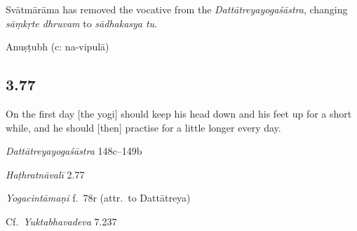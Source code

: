 \begin{ekdosis}
\begin{philcomm}[hp03_076]
Svātmārāma has removed the vocative from the \emph{Dattātreyayogaśāstra}, changing \emph{sāṃkṛte dhruvam} to \emph{sādhakasya tu}.
\end{philcomm}

\begin{metre}[hp03_076]
Anuṣṭubh (c: na-vipulā)
\end{metre}

\subsection*{3.77}
\begin{translation}[hp03_077]
On the first day [the yogi] should keep his head down and his feet up for a short while, and he should [then] practise for a little longer every day.
\end{translation}

\begin{sources}[hp03_077]
\emph{Dattātreyayogaśāstra} 148c–149b
\begin{versinnote}
\end{versinnote}
\end{sources}

\begin{testimonia}[hp03_077]
\emph{Haṭhratnāvalī} 2.77
\begin{versinnote}
\tl{\var{cordhvapādau ] cordhvapādaḥ \vl}\\!}
\end{versinnote}

\emph{Yogacintāmaṇi} f.~78r (attr.~to Dattātreya)
\begin{versinnote}
\end{versinnote}

Cf.~\emph{Yuktabhavadeva} 7.237
\begin{versinnote}
\end{versinnote}
\end{testimonia}


\end{ekdosis}
